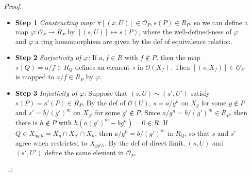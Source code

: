 \begin{proof}
    \begin{itemize}
        \item \textbf{Step 1} \textit{Constructing map:} $\forall [(x,U)] \in \mathcal{O}_P, s(P) \in R_P$, so we can define a map $\varphi: \mathcal{O}_P \to R_P$ by $[(s,U)] \mapsto s(P)$, where the well-defined-ness of $\varphi$ and $\varphi$ a ring homomorphism are given by the def of equivalence relation.

        \item \textbf{Step 2} \textit{Surjectivity of $\varphi$:} If $a,f \in R$ with $f\notin P$, then the map $s(Q) =a/f \in R_Q$ defines an element $s$ in $\mathcal{O} (X_f)$. Then $[(s,X_f)] \in \mathcal{O}_P$ is mapped to $a/f \in R_P$ by $\varphi$.

        \item \textbf{Step 3} \textit{Injectivity of $\varphi$:} Suppose that $(s,U) \sim (s',U')$ satisfy $s(P)= s'(P) \in R_P$. By the def of $\mathcal{O} (U)$, $s=a/g^n$ on $X_g$ for some $g\notin P$ and $s'=b/(g')^m$ on $X_{g'}$ for some $g'\notin P$. Since $a/g^n=b/(g')^m \in R_P$, then there is $h \notin P$ with $h(a(g')^m -bg^n)=0 \in R$. If $Q \in X_{gg'h}= X_g \cap X_{g'} \cap X_h$, then $a/g^n= b/(g')^m$ in $R_Q$, so that $s$ and $s'$ agree when restricted to $X_{gg'h}$. By the def of direct limit, $(s,U)$ and $(s',U')$ define the same element in $\mathcal{O}_P$.
    \end{itemize}
\end{proof}

